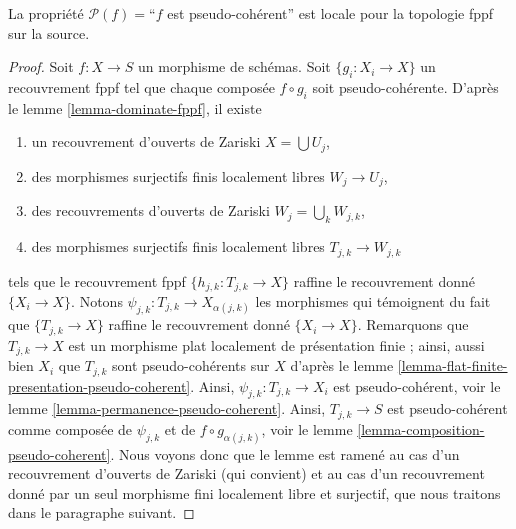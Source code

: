 \begin{lemma}
\label{lemma-pseudo-coherent-fppf-local-source}
La propriété $\mathcal{P}(f) =$``$f$ est pseudo-cohérent''
est locale pour la topologie fppf sur la source.
\end{lemma}

\begin{proof}
Soit $f : X \to S$ un morphisme de schémas.
Soit $\{g_i : X_i \to X\}$ un recouvrement fppf tel que chaque composée
$f \circ g_i$ soit pseudo-cohérente. D'après le
lemme \ref{lemma-dominate-fppf},
il existe
\begin{enumerate}
\item un recouvrement d'ouverts de Zariski $X = \bigcup U_j$,
\item des morphismes surjectifs finis localement libres $W_j \to U_j$,
\item des recouvrements d'ouverts de Zariski $W_j = \bigcup_k W_{j, k}$,
\item des morphismes surjectifs finis localement libres $T_{j, k} \to W_{j, k}$
\end{enumerate}
tels que le recouvrement fppf $\{h_{j, k} : T_{j, k} \to X\}$ raffine le
recouvrement donné $\{X_i \to X\}$. Notons $\psi_{j, k} : T_{j, k} \to X_{\alpha(j, k)}$
les morphismes qui témoignent du fait que $\{T_{j, k} \to X\}$ raffine
le recouvrement donné $\{X_i \to X\}$. Remarquons que $T_{j, k} \to X$ est un morphisme plat
localement de présentation finie ; ainsi, aussi bien $X_i$ que $T_{j, k}$ sont
pseudo-cohérents sur $X$ d'après le
lemme \ref{lemma-flat-finite-presentation-pseudo-coherent}.
Ainsi, $\psi_{j, k} : T_{j, k} \to X_i$ est pseudo-cohérent, voir le
lemme \ref{lemma-permanence-pseudo-coherent}.
Ainsi, $T_{j, k} \to S$ est pseudo-cohérent comme composée
de $\psi_{j, k}$ et de $f \circ g_{\alpha(j, k)}$, voir le
lemme \ref{lemma-composition-pseudo-coherent}.
Nous voyons donc que le lemme est ramené au cas d'un recouvrement
d'ouverts de Zariski (qui convient) et au cas d'un recouvrement
donné par un seul morphisme fini localement libre et surjectif, que nous
traitons dans le paragraphe suivant.


\end{proof}
